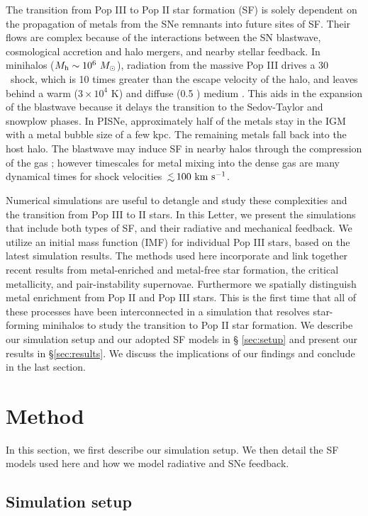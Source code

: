 \documentclass[12pt]{article}
\newcommand{\cubecm}{\ifmmode{{\rm cm^{-3}}}\else{cm$^{-3}$}\fi}
\newcommand{\lsim}{\lower0.3em\hbox{$\,\buildrel <\over\sim\,$}}
\newcommand{\kms}{\ifmmode{{\rm km~s^{-1}}}\else{km s$^{-1}$}\fi}
\newcommand{\Ms}{\ifmmode{M_\odot}\else{$M_\odot$}\fi}
\begin{document}
The transition from Pop III to Pop II star formation (SF) is solely
dependent on the propagation of metals from the SNe remnants into
future sites of SF.  Their flows are complex because of the
interactions between the SN blastwave, cosmological accretion and halo
mergers, and nearby stellar feedback.  In minihalos ($M_{\rm h} \sim
10^6~\Ms$), radiation from the massive Pop III drives a 30 \kms~shock,
which is 10 times greater than the escape velocity of the halo, and
leaves behind a warm ($3 \times 10^4$ K) and diffuse (0.5 \cubecm)
medium \cite{Kitayama04, Whalen04, Abel07}.  This aids in the
expansion of the blastwave because it delays the transition to the
Sedov-Taylor and snowplow phases.  In PISNe, approximately half of the
metals stay in the IGM with a metal bubble size of a few kpc.  The
remaining metals fall back into the host halo.  The blastwave may
induce SF in nearby halos through the compression of the gas
\cite{Ferrara98}; however timescales for metal mixing into the dense gas are
many dynamical times \cite{Cen08} for shock velocities $\lsim100~\kms$.

Numerical simulations are useful to detangle and study these
complexities and the transition from Pop III to II stars.  In this
Letter, we present the simulations that include both types of SF, and
their radiative and mechanical feedback.  We utilize an initial mass
function (IMF) for individual Pop III stars, based on the latest
simulation results.  The methods used here incorporate and link
together recent results from metal-enriched and metal-free star
formation, the critical metallicity, and pair-instability supernovae.
Furthermore we spatially distinguish metal enrichment from Pop II and
Pop III stars.  This is the first time that all of these processes
have been interconnected in a simulation that resolves star-forming
minihalos to study the transition to Pop II star formation.  We
describe our simulation setup and our adopted SF models in \S
\ref{sec:setup} and present our results in \S \ref{sec:results}.  We
discuss the implications of our findings and conclude in the last
section.

\section*{Method}
\label{sec:setup}

In this section, we first describe our simulation setup.  We then
detail the SF models used here and how we model radiative and SNe
feedback.

\subsection*{Simulation setup}
\end{document}
